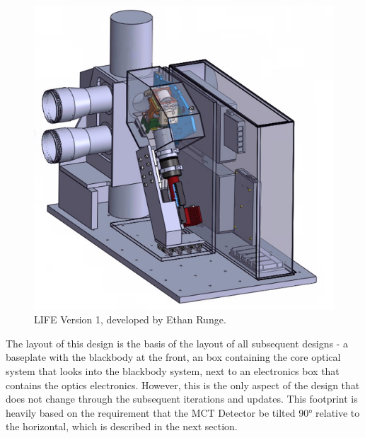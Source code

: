 \begin{figure}[h] %
    \centering
    \includegraphics{chap3_images/LIFE_V1.png}
    \caption{LIFE Version 1, developed by Ethan Runge.}
    \label{fig:LIFE_V1}
\end{figure}

The layout of this design is the basis of the layout of all subsequent designs - a baseplate with the blackbody at the front, an box containing the core optical system that looks into the blackbody system, next to an electronics box that contains the optics electronics. However, this is the only aspect of the design that does not change through the subsequent iterations and updates. This footprint is heavily based on the requirement that the MCT Detector be tilted 90° relative to the horizontal, which is described in the next section.

